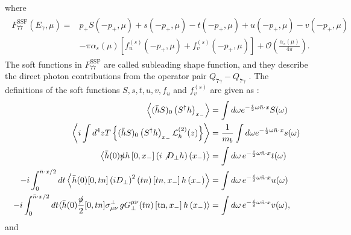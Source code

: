where 
\begin{eqnarray}
\begin{aligned}
F_{77}^{\mathrm{SSF}}\left(E_{\gamma}, \mu\right)=& p_{+} S\left(-p_{+}, \mu\right)+s\left(-p_{+}, \mu\right)-t\left(-p_{+}, \mu\right)+u\left(-p_{+}, \mu\right)-v\left(-p_{+}, \mu\right) \\
&-\pi \alpha_{s}(\mu)\left[f_{u}^{(s)}\left(-p_{+}, \mu\right)+f_{v}^{(s)}\left(-p_{+}, \mu\right)\right]+\mathcal{O}\left(\frac{\alpha_{s}(\mu)}{4 \pi}\right).
\end{aligned}
\end{eqnarray}
The soft functions in $F_{77}^{\mathrm{SSF}}$ are called subleading shape function, and they describe the direct photon contributions from the operator pair $Q_{7\gamma}-Q_{7\gamma}$ \cite{Bosch:2004cb}. The definitions of the soft functions $S,s,t,u,v,f_u$ and $f_v^{(s)}$ are given as \cite{Bosch:2004cb,Paz:2009ut}:
\begin{eqnarray}\label{eqn:chapter3_soft_fn_ssf}
\begin{aligned}
\left\langle(\bar{h} S)_{0}\left(S^{\dagger} h\right)_{x_{-}}\right\rangle &=\int d \omega e^{-\frac{i}{2} \omega \bar{n} \cdot x} S(\omega) \\
\left\langle i \int d^{4} z T\left\{(\bar{h} S)_{0}\left(S^{\dagger} h\right)_{x_{-}} \mathcal{L}_{h}^{(2)}(z)\right\}\right\rangle &=\frac{1}{m_{b}} \int d \omega e^{-\frac{i}{2} \omega \bar{n} \cdot x} s(\omega) \\
\left\langle\bar{h}(0) \slashed{n} h\left[0, x_{-}\right]\left(i \not D_{\perp} h\right)\left(x_{-}\right)\right\rangle &=\int d \omega \, e^{-\frac{i}{2} \omega \bar{n} \cdot x} t(\omega) \\
-i \int_{0}^{\bar{n} \cdot x / 2} d t\left\langle\bar{h}(0)[0, t n]\left(i D_{\perp}\right)^{2}(t n)\left[t n, x_{-}\right] h\left(x_{-}\right)\right\rangle &=\int d \omega \, e^{-\frac{i}{2} \omega \bar{n} \cdot x} u(\omega) \\
-i \int_{0}^{\bar{n} \cdot x / 2} d t\langle\bar{h}(0) \frac{\slashed{n}}{2}[0, t n] \sigma_{\mu \nu}^{\perp}\, g G_{\perp}^{\mu \nu}(t n)\left[\operatorname{tn}, x_{-}\right] h\left(x_{-}\right)\rangle &=\int d \omega \, e^{-\frac{i}{2} \omega \bar{n} \cdot x} v(\omega),
\end{aligned}
\end{eqnarray} 
and
